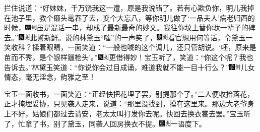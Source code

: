 拦住说道：``好妹妹，千万饶我这一遭，原是我说错了。若有心欺负你，明儿我掉在池子里，教个癞头鼋吞了去，变个大忘八，等你明儿做了`一品夫人'病老归西的时候，{\includegraphics[width=3mm]{../Images/00004}\includegraphics[width=3mm]{../Images/00011}\footnotesize \kaishu 虽是混话一串，却成了最新最奇的妙文。}我往你坟上替你驮一辈子的碑去。''{\includegraphics[width=3mm]{../Images/00009}\includegraphics[width=3mm]{../Images/00012}\footnotesize \kaishu 此誓新鲜。}说的林黛玉``嗤''的一声笑了，{\includegraphics[width=3mm]{../Images/00004}\includegraphics[width=3mm]{../Images/00011}\footnotesize \kaishu 看官想用何等话，令黛玉一笑收科？}揉着眼睛，一面笑道：``一般也唬的这个调儿，还只管胡说。`呸，原来是苗而不秀，是个银样鑞枪头'。''{\includegraphics[width=3mm]{../Images/00009}\includegraphics[width=3mm]{../Images/00012}\footnotesize \kaishu 更借得妙！}宝玉听了，笑道：``你这个呢？我也告诉去。''林黛玉笑道：``你说你会过目成诵，难道我就不能一目十行么？''{\includegraphics[width=3mm]{../Images/00006}\includegraphics[width=3mm]{../Images/00011}\footnotesize \kaishu 儿女情态，毫无淫念，韵雅之至！}

宝玉一面收书，一面笑道：``正经快把花埋了罢，别提那个了。''二人便收拾落花，正才掩埋妥协，只见袭人走来，说道：``那里没找到，摸在这里来。那边大老爷身上不好，姑娘们都过去请安，老太太叫打发你去呢。快回去换衣裳去罢。''宝玉听了，忙拿了书，别了黛玉，同袭人回房换衣不提。{\includegraphics[width=3mm]{../Images/00004}\includegraphics[width=3mm]{../Images/00012}\footnotesize \kaishu 一语度下。}

